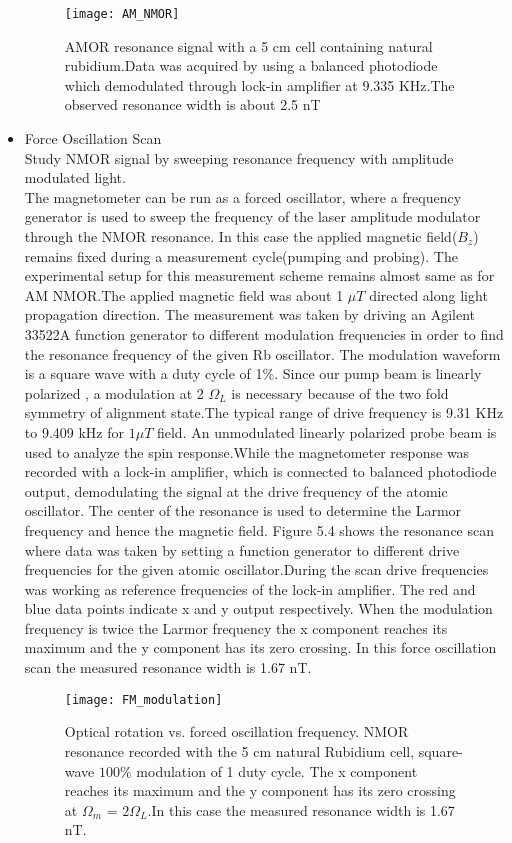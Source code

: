\documentclass[12pt]{report}
\begin{document}
\begin{itemize}
\begin{figure}[h]
\centering\texttt{[image: AM\_NMOR]}
\caption{AMOR resonance signal with a 5 cm cell containing natural rubidium.Data was acquired by using  a balanced photodiode which demodulated through lock-in amplifier at 9.335 KHz.The observed resonance width is about 2.5 nT}
\end{figure} 
\newpage
\item Force Oscillation Scan\\
Study NMOR signal by sweeping resonance frequency with amplitude modulated light.\\
The magnetometer can be run as a forced oscillator, where a
frequency generator is used to sweep the frequency of the laser amplitude modulator through the NMOR resonance. In this case the applied magnetic field($B_z$) remains fixed during a measurement cycle(pumping and probing).  The experimental setup for this measurement scheme remains almost same as for AM NMOR.The applied magnetic field was about 1  $\mu T $ directed along light propagation direction. 
The measurement was taken by driving an Agilent 33522A function generator to different modulation frequencies in order to find the resonance frequency of the given Rb oscillator. The modulation waveform is a square wave with a duty cycle of 1\%. Since our pump beam is linearly polarized , a modulation at 2 $\Omega_{L}$ is necessary because of the two fold symmetry of alignment state.The typical range of drive frequency is 9.31 KHz to 9.409 kHz for $1\mu T$ field. An unmodulated linearly polarized probe beam is used to analyze the spin response.While the magnetometer response was recorded with a lock-in amplifier, which is connected to balanced photodiode output, demodulating the signal at the drive frequency of the atomic oscillator. 
The center of the resonance is used to determine the Larmor frequency and hence the magnetic field. Figure 5.4 shows the resonance scan where data was taken by setting a function generator to different drive frequencies for the given atomic oscillator.During the scan drive frequencies was working as reference frequencies of the lock-in amplifier. The red and blue data points indicate x and y output respectively. When the modulation frequency is twice the Larmor frequency the x component reaches its maximum and the y component has its zero crossing. In this force oscillation scan the measured resonance width  is 1.67 nT. 
\begin{figure}[h]
\centering\texttt{[image: FM\_modulation]}
\caption{Optical rotation vs. forced oscillation frequency. NMOR resonance recorded with the 5 cm natural Rubidium cell, square-wave $100\%$ modulation of 1 duty cycle. The x component reaches its maximum and the y component has its zero crossing at $\Omega_m$ = $2\Omega_{L}$.In this case the measured resonance width is 1.67 nT.} 
\end{figure} 
   \end{itemize}
  \newpage
\end{document}
